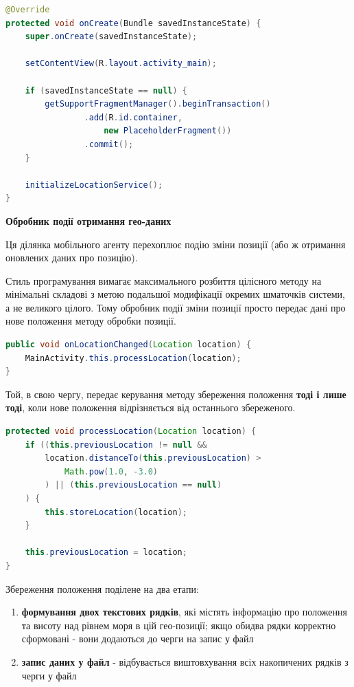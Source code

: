 \documentclass[simple,a4paper,14pt,ukrainian,utf8]{eskdtext}
\begin{document}
        	\begin{lstlisting}[language=Java]
@Override
protected void onCreate(Bundle savedInstanceState) {
    super.onCreate(savedInstanceState);

    setContentView(R.layout.activity_main);

    if (savedInstanceState == null) {
        getSupportFragmentManager().beginTransaction()
                .add(R.id.container, 
                	new PlaceholderFragment())
                .commit();
    }

    initializeLocationService();
}
        	\end{lstlisting}
        	
        	\textbf{Обробник події отримання гео-даних}
        	
        	Ця ділянка мобільного агенту перехоплює подію зміни позиції (або ж отримання оновлених даних про позицію).
        	
        	Стиль програмування вимагає максимального розбиття цілісного методу на мінімальні складові з метою подальшої модифікації окремих шматочків системи, а не великого цілого. Тому обробник події зміни позиції просто передає дані про нове положення методу обробки позиції.
        	
\begin{lstlisting}[language=Java]
public void onLocationChanged(Location location) {
	MainActivity.this.processLocation(location);
}
\end{lstlisting}

			Той, в свою чергу, передає керування методу збереження положення \textbf{тоді і лише тоді}, коли нове положення відрізняється від останнього збереженого.
			
\begin{lstlisting}[language=Java]
protected void processLocation(Location location) {
    if ((this.previousLocation != null && 
    	location.distanceTo(this.previousLocation) > 
    		Math.pow(1.0, -3.0)
    	) || (this.previousLocation == null)
   	) {
        this.storeLocation(location);
    }

    this.previousLocation = location;
}
\end{lstlisting}

			Збереження положення поділене на два етапи:
			
			\begin{enumerate}
				\item \textbf{формування двох текстових рядків}, які містять інформацію про положення та висоту над рівнем моря в цій гео-позиції; якщо обидва рядки корректно сформовані - вони додаються до черги на запис у файл
				\item \textbf{запис даних у файл} - відбувається виштовхування всіх накопичених рядків з черги у файл
			\end{enumerate}
			
\end{document}
